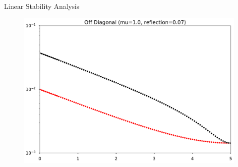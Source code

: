 \begin{frame}{Linear Stability Analysis}


\begin{tcolorbox}

      \begin{figure}
         \includegraphics[width=\textwidth]{assets/halo-mu-1-reflection-0p07}
      \end{figure}


\end{tcolorbox}



\end{frame}
